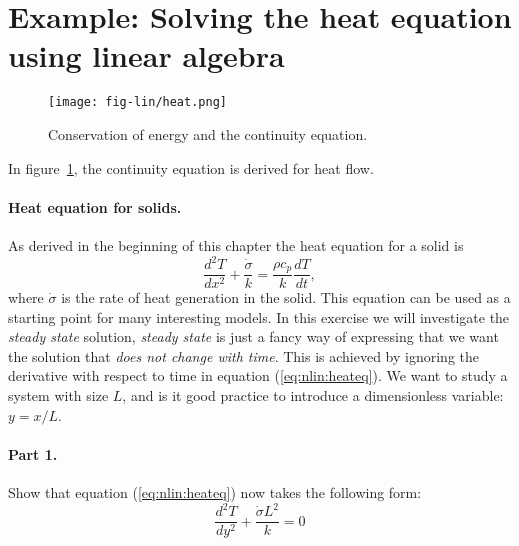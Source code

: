 \documentclass[graybox,sectrefs,envcountresetchap,open=right,final]{svmonodo}
\makeatletter
\newenvironment{doconceexercise}{}{}
\newcounter{doconceexercisecounter}%
\newcommand\listofexercises{
\chapter*{List of Exercises
          \@mkboth{List of Exercises}{List of Exercises}}
\markboth{List of Exercises}{List of Exercises}
\@starttoc{loe}
}
\makeatother
\begin{document}
\section{Example: Solving the heat equation using linear algebra}

\begin{doconceexercise}

                             

\begin{figure}[!ht]  %
  \centerline{\texttt{[image: fig-lin/heat.png]}}
  \caption{
  Conservation of energy and the continuity equation. \label{fig:nlin:heat}
  }
\end{figure}

In figure~\ref{fig:nlin:heat}, the continuity equation is derived for
heat flow.
\paragraph{Heat equation for solids.}
As derived in the beginning of this chapter the heat equation for a solid is
\begin{equation}
\frac{d^2T}{dx^2}+\frac{\dot{\sigma}}{k}=\frac{\rho c_p}{k}\frac{dT}{dt},
\label{eq:nlin:heateq}
\end{equation}
where $\dot{\sigma}$ is the rate of heat generation in the solid. This
equation can be used as a starting point for many interesting
models. In this exercise we will investigate the \emph{steady state}
solution, \emph{steady state} is just a fancy way of expressing that we
want the solution that \emph{does not change with time}. This is achieved
by ignoring the derivative with respect to time in equation
(\ref{eq:nlin:heateq}). We want to study a system with size $L$, and is
it good practice to introduce a dimensionless variable: $y=x/L$. 

\paragraph{Part 1.}

Show that equation (\ref{eq:nlin:heateq}) now takes the following form:
\begin{equation}
\frac{d^2T }{dy^2}+\frac{\dot{\sigma}L^2}{k}=0
\label{eq:nlin:heat2}
\end{equation}

\end{doconceexercise}
\end{document}
